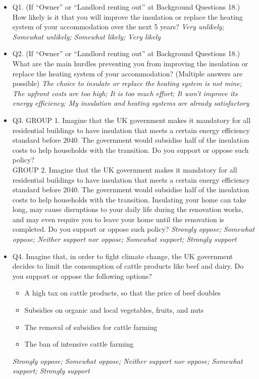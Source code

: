 \documentclass{article}
\begin{document}
\begin{itemize}
    \item Q1. (If ``Owner'' or ``Landlord renting out'' at Background Questions 18.) How likely is it that you will improve the insulation or replace the heating system of your accommodation over the next 5 years?
    \textit{Very unlikely; Somewhat unlikely; Somewhat likely; Very likely}
    \item Q2. (If ``Owner'' or ``Landlord renting out'' at Background Questions 18.) What are the main hurdles preventing you from improving the insulation or replace the heating system of your accommodation? (Multiple answers are possible)
    \textit{The choice to insulate or replace the heating system is not mine; The upfront costs are too high; It is too much effort; It won't improve its energy efficiency; My insulation and heating systems are already satisfactory}
    \item Q3. GROUP 1.
    Imagine that the UK government makes it mandatory for all residential buildings to have insulation that meets a certain energy efficiency standard before 2040. The government would subsidise half of the insulation costs to help households with the transition. 
    Do you support or oppose such policy? \\
    GROUP 2. Imagine that the UK government makes it mandatory for all residential buildings to have insulation that meets a certain energy efficiency standard before 2040. The government would subsidise half of the insulation costs to help households with the transition.
    Insulating your home can take long, may cause disruptions to your daily life during the renovation works, and may even require you to leave your home until the renovation is completed.
    Do you support or oppose such policy? 
    \textit{Strongly oppose; Somewhat oppose; Neither support nor oppose; Somewhat support; Strongly support}
    \item Q4. Imagine that, in order to fight climate change, the UK government decides to limit the consumption of cattle products like beef and dairy.
    Do you support or oppose the following options?
    \begin{itemize}
        \item A high tax on cattle products, so that the price of beef doubles
        \item Subsidies on organic and local vegetables, fruits, and nuts
        \item The removal of subsidies for cattle farming
        \item The ban of intensive cattle farming
    \end{itemize}
    \textit{Strongly oppose; Somewhat oppose; Neither support nor oppose; Somewhat support; Strongly support}
\end{itemize}
\end{document}
